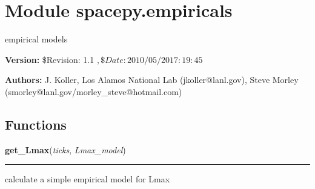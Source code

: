 %
%
%


\section{Module spacepy.empiricals}

    \label{spacepy:empiricals}
empirical models

\textbf{Version:} \$Revision: 1.1 $, \$Date: 2010/05/20 17:19:45 $



\textbf{Authors:}
J. Koller, Los Alamos National Lab (jkoller@lanl.gov),
    Steve Morley (smorley@lanl.gov/morley\_steve@hotmail.com)



  \subsection{Functions}

    \label{spacepy:empiricals:get_Lmax}

    \vspace{0.5ex}

\hspace{.8\funcindent}\begin{boxedminipage}{\funcwidth}

    \raggedright \textbf{get\_Lmax}(\textit{ticks}, \textit{Lmax\_model})

    \vspace{-1.5ex}

    \rule{\textwidth}{0.5\fboxrule}
\setlength{\parskip}{2ex}
    calculate a simple empirical model for Lmax

\setlength{\parskip}{1ex}
    \end{boxedminipage}

